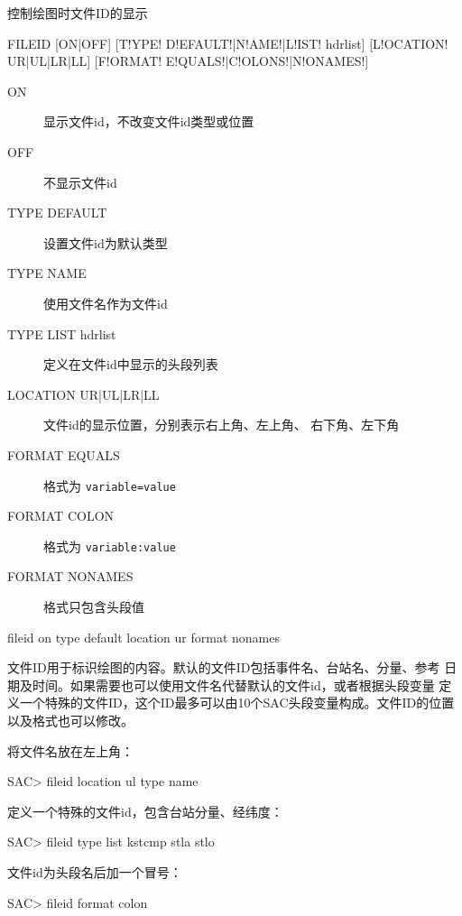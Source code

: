 \label{cmd:fileid}

控制绘图时文件ID的显示

\begin{SACSTX}
FILEID [ON|OFF] [T!YPE! D!EFAULT!|N!AME!|L!IST! hdrlist]
    [L!OCATION! UR|UL|LR|LL] [F!ORMAT! E!QUALS!|C!OLONS!|N!ONAMES!]
\end{SACSTX}

\begin{description}
\item [ON] 显示文件id，不改变文件id类型或位置
\item [OFF] 不显示文件id
\item [TYPE DEFAULT] 设置文件id为默认类型
\item [TYPE NAME] 使用文件名作为文件id
\item [TYPE LIST hdrlist] 定义在文件id中显示的头段列表
\item [LOCATION UR|UL|LR|LL] 文件id的显示位置，分别表示右上角、左上角、
    右下角、左下角
\item [FORMAT EQUALS] 格式为 \texttt{variable=value}
\item [FORMAT COLON] 格式为 \texttt{variable:value}
\item [FORMAT NONAMES] 格式只包含头段值
\end{description}

\begin{SACDFT}
fileid on type default location ur format nonames
\end{SACDFT}

文件ID用于标识绘图的内容。默认的文件ID包括事件名、台站名、分量、参考
日期及时间。如果需要也可以使用文件名代替默认的文件id，或者根据头段变量
定义一个特殊的文件ID，这个ID最多可以由10个SAC头段变量构成。文件ID的位置
以及格式也可以修改。

将文件名放在左上角：
\begin{SACCode}
SAC> fileid location ul type name
\end{SACCode}

定义一个特殊的文件id，包含台站分量、经纬度：
\begin{SACCode}
SAC> fileid type list kstcmp stla stlo
\end{SACCode}

文件id为头段名后加一个冒号：
\begin{SACCode}
SAC> fileid format colon
\end{SACCode}
